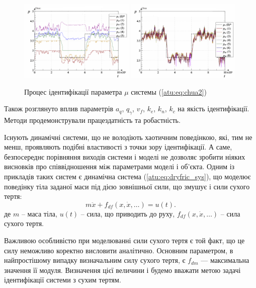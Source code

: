 \documentclass[a4paper,13pt]{atuaref}
\begin{document}
\begin{figure}[htb!]
\centerline{
    \includegraphics[width=0.49\textwidth]{p5/p/cha/chua/ql3rlWvnAAW/chua_id-p_t_pi_ql3rlWvnAAW_sign_xl.png}
    \hfill
    \includegraphics[width=0.49\textwidth]{p5/p/cha/chua/ql3rlWvnAAW/chua_id-p_t_p_ql3rlWvnAAW_sign_xl.png}
}
\caption{Процес ідентифікації параметра $\mu$ системы (\ref{atu:eq:chua2})
}
\label{atu:f:chua_id}
\end{figure}

Також розглянуто вплив параметрів $a_q$, $q_\gamma$, $v_f$, $k_e$, $k_n$, $k_c$
на якість ідентифікації. Методи
продемонстрували працездатність та робастність.


Існують динамічні системи, що не володіють хаотичним поведінкою, які, тим не
менш, проявляють подібні властивості з точки зору ідентифікації. А саме,
безпосереднє порівняння виходів системи і моделі не дозволяє зробити ніяких
висновків про співвідношення між параметрами моделі і об'єкта. Одним із
прикладів таких систем є динамічна система (\ref{atu:eq:dryfric_sys}), що
моделює поведінку тіла заданої маси під дією зовнішньої сили, що змушує і сили
сухого тертя: %
%
\begin{equation}
  m \ddot{x} + f_{df}( x, \dot{x}, \ldots)  = u(t).
\label{atu:eq:dryfric_sys}
\end{equation}
%
де
$m$ -- маса тіла,
$u(t)$ -- сила, що приводить до руху,
$ f_{df}( x, \dot{x}, \ldots)  $ -- сила сухого тертя.

Важливою особливістю при моделюванні сили сухого тертя є той факт, що це силу
неможливо коректно висловити аналітично. Основним параметром, в найпростішому
випадку визначальним силу сухого тертя, є $f_{dm} $ --- максимальна значення її
модуля. Визначення цієї величини і будемо вважати метою задачі ідентифікації
системи з сухим тертям.
\end{document}
